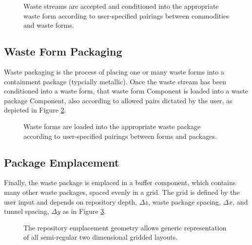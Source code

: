 \begin{figure}[htbp!]
\begin{center}
\def\svgwidth{.5\textwidth}

\end{center}
\caption[Waste stream conditioning in \Cyder.]{Waste streams are accepted and 
conditioned into the appropriate waste form according to user-specified 
pairings between commodities and waste forms.}
\label{fig:ws_conditioning}
\end{figure}

\subsection{Waste Form Packaging}

Waste packaging is the process of placing one or many waste forms into a 
containment package (typcially metallic). Once the waste stream has been 
conditioned into a waste form, that waste form Component is loaded into a waste 
package Component, also according to allowed pairs dictated by the user, as 
depicted in Figure \ref{fig:wf_packaging}.

\begin{figure}[htbp!]
\begin{center}
\def\svgwidth{.5\textwidth}

\end{center}
\caption[Waste packaging in \Cyder.]{Waste forms are loaded into the 
appropriate waste package according to user-specified pairings between forms 
and packages.}
\label{fig:wf_packaging}
\end{figure}


\subsection{Package Emplacement}

Finally, the waste package is emplaced in a buffer component, which 
contains many other waste packages, spaced evenly in a grid. The grid is 
defined by the user input and depends on repository depth, $\Delta z$, waste 
package spacing, $\Delta x$, and tunnel spacing, $\Delta y$ as in Figure 
\ref{fig:repo_layout}.

\begin{figure}[htbp!]
\begin{center}
\def\svgwidth{.5\textwidth}

\end{center}
\caption[The gridded \Cyder repository emplacement geometry.]{The \Cyder 
repository emplacement geometry allows generic representation of all semi-regular 
two dimensional gridded layouts.}
\label{fig:repo_layout}
\end{figure}

